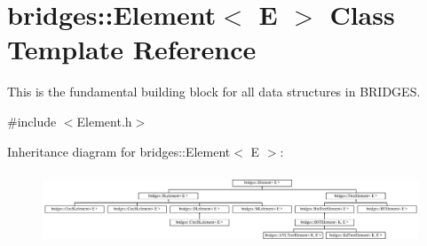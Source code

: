 \hypertarget{classbridges_1_1_element}{}\section{bridges\+:\+:Element$<$ E $>$ Class Template Reference}
\label{classbridges_1_1_element}


This is the fundamental building block for all data structures in B\+R\+I\+D\+G\+ES.  




{\ttfamily \#include $<$Element.\+h$>$}

Inheritance diagram for bridges\+:\+:Element$<$ E $>$\+:\begin{figure}[H]
\begin{center}
\leavevmode
\includegraphics[height=2.201258cm]{classbridges_1_1_element}
\end{center}
\end{figure}
